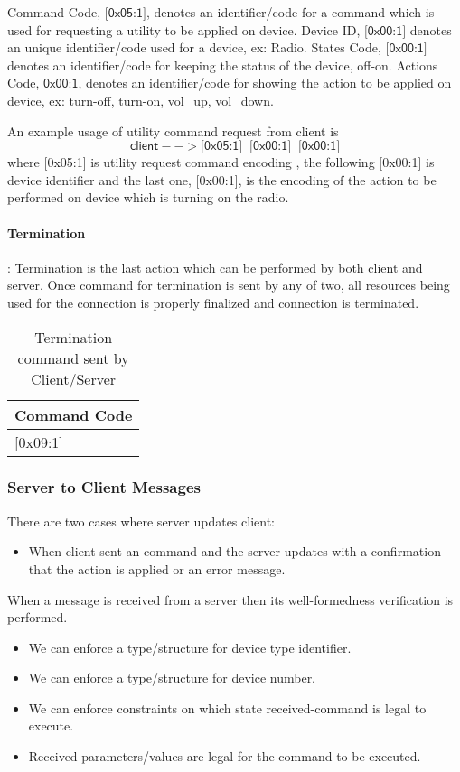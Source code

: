 \textsf{Command Code}, $\textsf{[0x05:1]}$, denotes an identifier/code for a command which is used for requesting a utility to be applied on device. \textsf{Device ID}, $\textsf{[0x00:1]}$ denotes an unique identifier/code used for a device, ex: \textsf{Radio}. \textsf{States Code}, $\textsf{[0x00:1]}$ denotes an identifier/code for keeping the status of the device, \textsf{off-on}. \textsf{Actions Code}, $\textsf{0x00:1}$, denotes an identifier/code for showing the action to be applied on device, ex: \textsf{turn-off, turn-on, vol\_up, vol\_down}.  


An example usage of utility command request from client is
\[\textsf{client} --> \textsf{[0x05:1]} \;\;  \textsf{[0x00:1]}   \;\;  \textsf{[0x00:1]}\]
where \textsf{[0x05:1]} is utility request command encoding , the following  \textsf{[0x00:1]} is device identifier and the last one,  \textsf{[0x00:1]}, is the encoding of the action to be performed on device which is turning on the radio.

\paragraph{Termination}: Termination is the last action which can be performed by both client and server. Once command for termination is sent by any of two, all resources being used for the connection is properly finalized and connection is terminated.

\begin{table}[ht!]
  \centering
  \begin{tabular}{l}
\hline
\textbf{Command Code} \\
\hline
\hline
\textsf{[0x09:1]}   \\
\hline
\hline
\end{tabular}
\caption{Termination command sent by Client/Server}
\end{table}

\subsubsection{Server to Client Messages}
\label{sec:pdus:pdu:s_to_c}
There are two cases where server updates client:
\begin{itemize}
\item When client sent an command and the server updates with a confirmation that the action is applied or an error message.
  \end{itemize}

When a message is received from a server then its well-formedness verification is performed.
\begin{itemize}
\item  We can enforce a type/structure for device type identifier.
\item We can enforce a type/structure for device number.
\item  We can enforce constraints on which state received-command is legal to execute.
\item Received parameters/values are legal for the command to be executed. 
\end{itemize}

